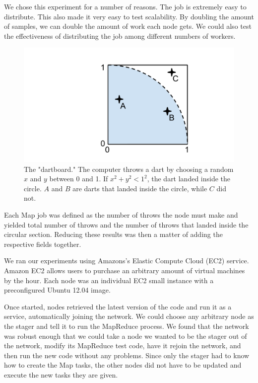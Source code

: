 We chose this experiment for a number of reasons. 
The job is extremely easy to distribute.  
This also made it very easy to test scalability. 
By doubling the amount of samples, we can double the amount of work each node gets.  
We could also test the effectiveness of distributing the job among different numbers of workers.


\begin{figure}
	\centering
	\includegraphics[width=0.5\linewidth]{figs/dartboard}
	\caption{The "dartboard." The computer throws a dart by choosing a random $x$ and $y$ between 0 and 1.  If $x^{2} + y^{2} < 1^{2} $, the dart landed inside the circle.  $A$ and $B$ are darts that landed inside the circle, while $C$ did not.}
	\label{fig:dartboard}
\end{figure}


Each Map job was defined as the number of throws the node must make and yielded total number of throws and the number of throws that landed inside the circular section.  
Reducing these results was then a matter of adding the respective fields together. 

We ran our experiments using Amazons's Elastic Compute Cloud (EC2) service.  
Amazon EC2 allows users to purchase an arbitrary amount of virtual machines by the hour. 
Each node was an individual EC2 small instance with a preconfigured Ubuntu 12.04 image.  

Once started, nodes retrieved the latest version of the code and run it as a service, automatically joining the network.  
We could choose any arbitrary node as the stager and tell it to run the MapReduce process. 
We found that the network was robust enough that we could take a node we wanted to be the stager out of the network, modify its MapReduce test code, have it rejoin the network, and then run the new code without any problems. 
Since only the stager had to know how to create the Map tasks, the other nodes did not have to be updated and execute the new tasks they are given.

